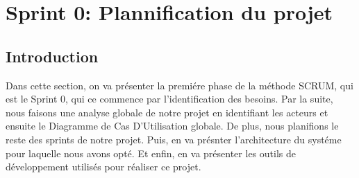 \chapter{Sprint 0: Plannification du projet}
\section{Introduction}
\noindent
Dans cette section, on va présenter la premiére phase de la méthode SCRUM, qui est le Sprint 0, qui ce commence par l'identification des besoins. Par la suite, nous faisons une analyse globale de notre projet en identifiant les acteurs et ensuite le Diagramme de Cas D'Utilisation globale. De plus, nous planifions le reste des sprints de notre projet. Puis, en va présnter l'architecture du systéme pour laquelle nous avons opté. Et enfin, en va présenter les outils de développement utilisés pour réaliser ce projet.






